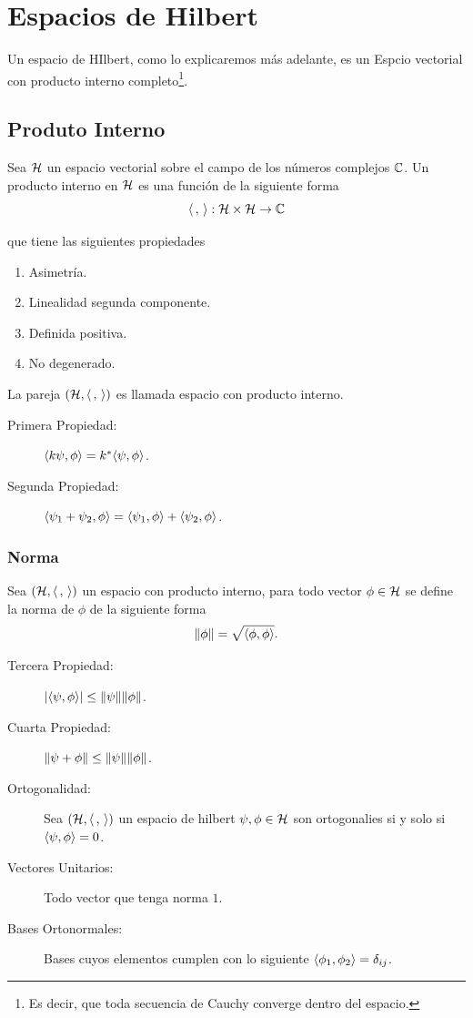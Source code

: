 \section{Espacios de Hilbert}
Un espacio de HIlbert, como lo explicaremos más adelante, es un Espcio vectorial con producto interno completo\footnote{Es decir, que toda secuencia de Cauchy converge dentro del espacio.}.

\subsection{Produto Interno}
Sea $\mathcal{H}$ un espacio vectorial sobre el campo de los números complejos $\mathbb{C}$. Un producto interno en $\mathcal{H}$ es una función de la siguiente forma
	$$ \langle \, , \, \rangle: \mathcal{H} \times \mathcal{H} \to \mathbb{C} $$

que tiene las siguientes propiedades
\begin{enumerate}
	\item Asimetría.
	\item Linealidad segunda componente.
	\item Definida positiva.
	\item No degenerado.
\end{enumerate}
La pareja $\qty(\mathcal{H} ,\langle \, , \, \rangle)$ es llamada espacio con producto interno. 
\begin{description}
	\item[Primera Propiedad: ] $\langle k\psi , \phi \rangle = k^* \langle \psi , \phi \rangle$.
	\item[Segunda Propiedad: ] $\langle \psi _1 + \psi _2 , \phi \rangle = \langle \psi _1 , \phi \rangle + \langle \psi _2 , \phi \rangle$.
\end{description}

\subsubsection{Norma}
Sea $(\mathcal{H} ,\langle \, , \, \rangle)$ un espacio con producto interno, para todo vector $\phi \in \mathcal{H}$ se define la norma de $\phi$ de la siguiente forma
	$$ \norm{\phi} = \sqrt{\langle \phi , \phi \rangle}. $$
\begin{description}
	\item[Tercera Propiedad: ] $\abs{\langle \psi , \phi \rangle} \leq \norm{\psi}\norm{\phi}$.
	\item[Cuarta Propiedad: ] $\norm{\psi + \phi} \leq \norm{\psi} \norm{\phi}$.
	\item[Ortogonalidad: ] Sea $\qty(\mathcal{H} ,\langle \, , \, \rangle)$ un espacio de hilbert $\psi ,\phi \in \mathcal{H}$ son ortogonalies si y solo si $\langle \psi , \phi \rangle = 0$.
	\item[Vectores Unitarios: ] Todo vector que tenga norma $1$.
	\item[Bases Ortonormales: ] Bases cuyos elementos cumplen con lo siguiente $\langle \phi _1 , \phi _2 \rangle = \delta _{ij}$. 
\end{description}


